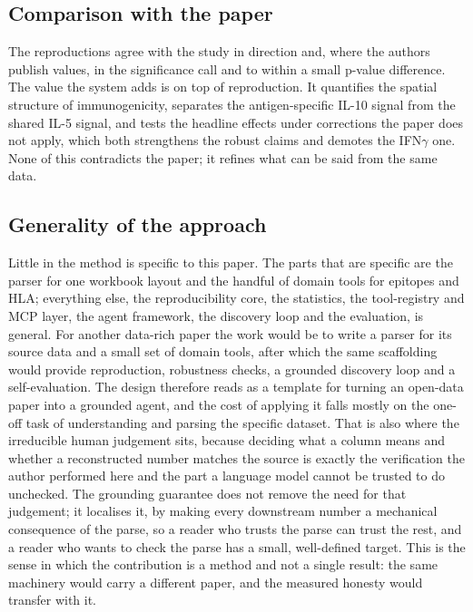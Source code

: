 \documentclass[11pt]{article}
\begin{document}
\subsection{Comparison with the paper}
The reproductions agree with the study in direction and, where the authors publish values, in the
significance call and to within a small p-value difference. The value the system adds is on top of
reproduction. It quantifies the spatial structure of immunogenicity, separates the antigen-specific
IL-10 signal from the shared IL-5 signal, and tests the headline effects under corrections the paper
does not apply, which both strengthens the robust claims and demotes the IFN$\gamma$ one. None of this
contradicts the paper; it refines what can be said from the same data.

\subsection{Generality of the approach}
Little in the method is specific to this paper. The parts that are specific are the parser for one
workbook layout and the handful of domain tools for epitopes and HLA; everything else, the
reproducibility core, the statistics, the tool-registry and MCP layer, the agent framework, the
discovery loop and the evaluation, is general. For another data-rich paper the work would be to write
a parser for its source data and a small set of domain tools, after which the same scaffolding would
provide reproduction, robustness checks, a grounded discovery loop and a self-evaluation. The design
therefore reads as a template for turning an open-data paper into a grounded agent, and the cost of
applying it falls mostly on the one-off task of understanding and parsing the specific dataset. That
is also where the irreducible human judgement sits, because deciding what a column means and whether a
reconstructed number matches the source is exactly the verification the author performed here and the
part a language model cannot be trusted to do unchecked. The grounding guarantee does not remove the
need for that judgement; it localises it, by making every downstream number a mechanical consequence
of the parse, so a reader who trusts the parse can trust the rest, and a reader who wants to check the
parse has a small, well-defined target. This is the sense in which the contribution is a method and
not a single result: the same machinery would carry a different paper, and the measured honesty would
transfer with it.
\end{document}
